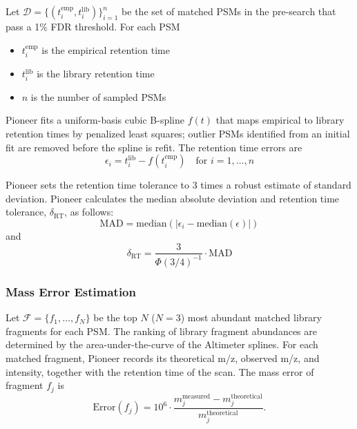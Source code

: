 \documentclass[pdflatex,sn-nature]{sn-jnl}
\begin{document}
Let $\mathcal{D} = \{(t_i^{\text{emp}}, t_i^{\text{lib}})\}_{i=1}^{n}$ be the set of matched PSMs in the pre-search that pass a 1\% FDR threshold. For each PSM
\begin{itemize}
    \item $t_i^{\text{emp}}$ is the empirical retention time
    \item $t_i^{\text{lib}}$ is the library retention time
    \item $n$ is the number of sampled PSMs
\end{itemize}

Pioneer fits a uniform-basis cubic B-spline $f(t)$ that maps empirical to library retention times by penalized least squares; outlier PSMs identified from an initial fit are removed before the spline is refit. The retention time errors are
\begin{equation}
    \epsilon_i = t_i^{\text{lib}} - f(t_i^{\text{emp}}) \quad \text{for } i = 1,\ldots,n
\end{equation}

Pioneer sets the retention time tolerance to 3 times a robust estimate of standard deviation. Pioneer calculates the median absolute deviation and retention time tolerance, $\delta_{\text{RT}}$, as follows:
\begin{equation} \text{MAD} = \text{median}\left(|\epsilon_i - \text{median}(\epsilon)|\right) \end{equation}
and
\begin{equation}
    \delta_{\text{RT}} = \frac{3}{\Phi(3/4)^{-1}} \cdot \text{MAD}
\end{equation}

\subsubsection{Mass Error Estimation}\label{subsubsec:mass-error-estimation}
Let $\mathcal{F} = \{f_1, \ldots, f_N\}$ be the top $N$ ($N = 3$) most abundant matched library fragments for each PSM. The ranking of library fragment abundances are determined by the area-under-the-curve of the Altimeter splines. For each matched fragment, Pioneer records its theoretical m/z, observed m/z, and intensity, together with the retention time of the scan. The mass error of fragment $f_j$ is
\begin{equation}
    \text{Error}(f_j) = 10^6 \cdot \frac{m_j^{\text{measured}} - m_j^{\text{theoretical}}}{m_j^{\text{theoretical}}}.
\end{equation}
\end{document}
